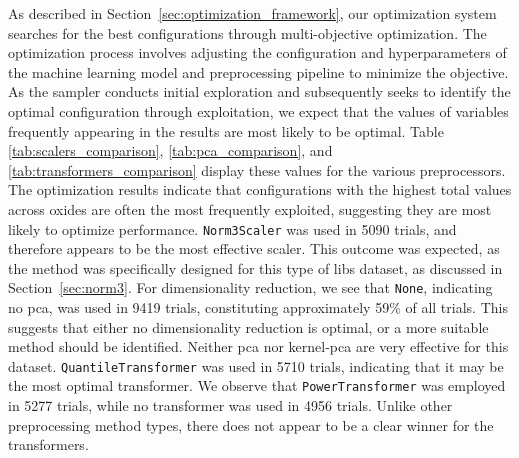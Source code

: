 As described in Section~\ref{sec:optimization_framework}, our optimization system searches for the best configurations through multi-objective optimization.
The optimization process involves adjusting the configuration and hyperparameters of the machine learning model and preprocessing pipeline to minimize the objective.
As the sampler conducts initial exploration and subsequently seeks to identify the optimal configuration through exploitation, we expect that the values of variables frequently appearing in the results are most likely to be optimal.
Table \ref{tab:scalers_comparison}, \ref{tab:pca_comparison}, and \ref{tab:transformers_comparison} display these values for the various preprocessors.
The optimization results indicate that configurations with the highest total values across oxides are often the most frequently exploited, suggesting they are most likely to optimize performance.
\texttt{Norm3Scaler} was used in 5090 trials, and therefore appears to be the most effective scaler.
This outcome was expected, as the method was specifically designed for this type of \gls{libs} dataset, as discussed in Section~\ref{sec:norm3}.
For dimensionality reduction, we see that \texttt{None}, indicating no \gls{pca}, was used in 9419 trials, constituting approximately 59\% of all trials.
This suggests that either no dimensionality reduction is optimal, or a more suitable method should be identified.
Neither \gls{pca} nor \gls{kernel-pca} are very effective for this dataset.
\texttt{QuantileTransformer} was used in 5710 trials, indicating that it may be the most optimal transformer.
We observe that \texttt{PowerTransformer} was employed in 5277 trials, while no transformer was used in 4956 trials. Unlike other preprocessing method types, there does not appear to be a clear winner for the transformers.



